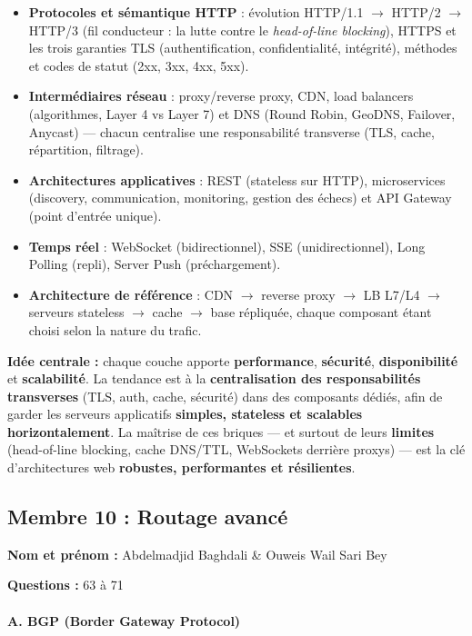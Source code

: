 \documentclass[12pt,a4paper]{article}
\newcommand{\membre}[2]{%
  \textbf{Nom et prénom :} #1 \par
  \textbf{Questions :} #2 \par
}
\begin{document}
\begin{itemize}
  \item \textbf{Protocoles et s\'emantique HTTP} : \'evolution HTTP/1.1 $\rightarrow$ HTTP/2 $\rightarrow$ HTTP/3 (fil conducteur : la lutte contre le \textit{head-of-line blocking}), HTTPS et les trois garanties TLS (authentification, confidentialit\'e, int\'egrit\'e), m\'ethodes et codes de statut (2xx, 3xx, 4xx, 5xx).
  \item \textbf{Interm\'ediaires r\'eseau} : proxy/reverse proxy, CDN, load balancers (algorithmes, Layer 4 vs Layer 7) et DNS (Round Robin, GeoDNS, Failover, Anycast) --- chacun centralise une responsabilit\'e transverse (TLS, cache, r\'epartition, filtrage).
  \item \textbf{Architectures applicatives} : REST (stateless sur HTTP), microservices (discovery, communication, monitoring, gestion des \'echecs) et API Gateway (point d'entr\'ee unique).
  \item \textbf{Temps r\'eel} : WebSocket (bidirectionnel), SSE (unidirectionnel), Long Polling (repli), Server Push (pr\'echargement).
  \item \textbf{Architecture de r\'ef\'erence} : CDN $\rightarrow$ reverse proxy $\rightarrow$ LB L7/L4 $\rightarrow$ serveurs stateless $\rightarrow$ cache $\rightarrow$ base r\'epliqu\'ee, chaque composant \'etant choisi selon la nature du trafic.
\end{itemize}

\noindent\textbf{Id\'ee centrale :} chaque couche apporte \textbf{performance}, \textbf{s\'ecurit\'e}, \textbf{disponibilit\'e} et \textbf{scalabilit\'e}. La tendance est \`a la \textbf{centralisation des responsabilit\'es transverses} (TLS, auth, cache, s\'ecurit\'e) dans des composants d\'edi\'es, afin de garder les serveurs applicatifs \textbf{simples, stateless et scalables horizontalement}. La ma\^itrise de ces briques --- et surtout de leurs \textbf{limites} (head-of-line blocking, cache DNS/TTL, WebSockets derri\`ere proxys) --- est la cl\'e d'architectures web \textbf{robustes, performantes et r\'esilientes}.

\subsection{Membre 10 : Routage avancé}
\membre{Abdelmadjid Baghdali \& Ouweis Wail Sari Bey}{63 à 71}

\paragraph{A. BGP (Border Gateway Protocol)}
\end{document}
